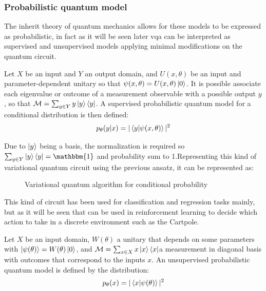 \subsubsection{Probabilistic quantum model}
The inherit theory of quantum mechanics allows for these models to be expressed as probabilistic, in fact as it will be seen later \acrlong{vqa} can be interpreted as supervised and unsupervised models applying minimal modifications on the quantum circuit.
\begin{mydef}
	Let $X$ be an input and $Y$ an output domain, and $U(x, \theta)$ be an input and parameter-dependent unitary so that $\psi(x, \theta) = U(x, \theta)\ket{0}$. It is possible associate each eigenvalue	or outcome of a measurement observable with a possible output $y$, so that $\mathcal{M} =  \sum_{y \in Y} y \ket{y} \bra{y}$. A supervised probabilistic quantum model for a conditional distribution is then defined:
	\begin{equation}
		p_\theta(y|x) = |\braket{y|\psi(x, \theta)}|^2
	\end{equation}
\end{mydef}
Due to ${\ket{y}}$ being a basis, the normalization is required so $\sum_{y \in Y} \ket{y} \bra{y} = \mathbbm{1}$ and probability sum to 1.Representing this kind of variational quantum circuit using the previous ansatz, it can be represented as:
\begin{center}
	\begin{figure}[!h]
		\centering
		\caption{Variational quantum algorithm for conditional probability}
		\label{vqa conditional}
	\end{figure}
\end{center}
This kind of circuit has been used for classification and regression tasks mainly, but as it will be seen that can be used in reinforcement learning to decide which action to take in a discrete environment such as the Cartpole.
\begin{mydef}
	Let $X$ be an input	domain, $W(\theta)$ a unitary that depends on some parameters with $\ket{\psi(\theta)} = W(\theta) \ket{0}$, and $\mathcal{M} = \sum_{x \in X} x \ket{x} \bra{x}$a measurement in diagonal basis with outcomes that correspond to the inputs $x$. An unsupervised probabilistic quantum model is defined by the distribution:
	\begin{equation}
		p_\theta(x) = |\braket{x|\psi(\theta)}|^2
	\end{equation}
\end{mydef}
